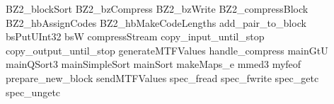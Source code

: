 BZ2_blockSort
BZ2_bzCompress
BZ2_bzWrite
BZ2_compressBlock
BZ2_hbAssignCodes
BZ2_hbMakeCodeLengths
add_pair_to_block
bsPutUInt32
bsW
compressStream
copy_input_until_stop
copy_output_until_stop
generateMTFValues
handle_compress
mainGtU
mainQSort3
mainSimpleSort
mainSort
makeMaps_e
mmed3
myfeof
prepare_new_block
sendMTFValues
spec_fread
spec_fwrite
spec_getc
spec_ungetc
